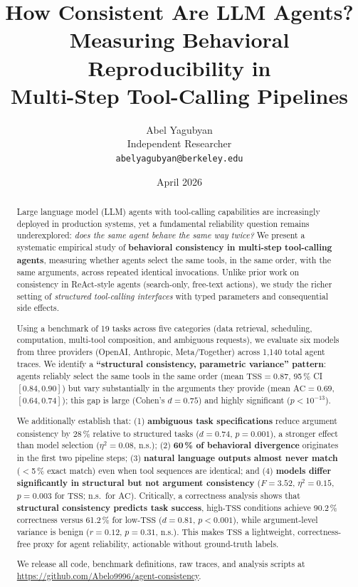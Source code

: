 \documentclass[letterpaper]{article}
\title{\textbf{How Consistent Are LLM Agents?}\\[4pt]
\large Measuring Behavioral Reproducibility in\\
Multi-Step Tool-Calling Pipelines}
\author{
  Abel Yagubyan\\[2pt]
  Independent Researcher\\
  \texttt{abelyagubyan@berkeley.edu}
}
\date{April 2026}
\newcommand{\tss}{\mathrm{TSS}}
\newcommand{\ac}{\mathrm{AC}}
\begin{document}
\maketitle

\begin{abstract}
Large language model (LLM) agents with tool-calling capabilities are increasingly
deployed in production systems, yet a fundamental reliability question remains
underexplored: \emph{does the same agent behave the same way twice?}
We present a systematic empirical study of \textbf{behavioral consistency in
multi-step tool-calling agents}, measuring whether agents select the same tools,
in the same order, with the same arguments, across repeated identical invocations.
Unlike prior work on consistency in ReAct-style agents (search-only, free-text
actions), we study the richer setting of \emph{structured tool-calling interfaces}
with typed parameters and consequential side effects.

Using a benchmark of 19 tasks across five categories (data retrieval, scheduling,
computation, multi-tool composition, and ambiguous requests), we evaluate six
models from three providers (OpenAI, Anthropic, Meta/Together) across 1,140
total agent traces. We identify a \textbf{``structural consistency, parametric
variance'' pattern}: agents reliably select the same tools in the same order
(mean $\tss = 0.87$, 95\,\% CI $[0.84, 0.90]$) but vary substantially in the
arguments they provide (mean $\ac = 0.69$, $[0.64, 0.74]$); this gap is large
(Cohen's $d = 0.75$) and highly significant ($p < 10^{-13}$).

We additionally establish that: (1) \textbf{ambiguous task specifications} reduce
argument consistency by 28\,\% relative to structured tasks ($d = 0.74$,
$p = 0.001$), a stronger effect than model selection ($\eta^2=0.08$, n.s.);
(2) \textbf{60\,\% of behavioral divergence} originates in the first two pipeline
steps; (3) \textbf{natural language outputs almost never match} ($<$5\,\% exact
match) even when tool sequences are identical; and (4) \textbf{models differ
significantly in structural but not argument consistency}
($F=3.52$, $\eta^2=0.15$, $p=0.003$ for $\tss$; n.s.\ for $\ac$).
Critically, a correctness analysis shows that \textbf{structural consistency
predicts task success}, high-$\tss$ conditions achieve 90.2\,\% correctness
versus 61.2\,\% for low-$\tss$ ($d=0.81$, $p<0.001$), while argument-level
variance is benign ($r=0.12$, $p=0.31$, n.s.). This makes $\tss$ a lightweight,
correctness-free proxy for agent reliability, actionable without ground-truth
labels.

We release all code, benchmark definitions, raw traces, and analysis scripts at
\url{https://github.com/Abelo9996/agent-consistency}.
\end{abstract}
\end{document}
